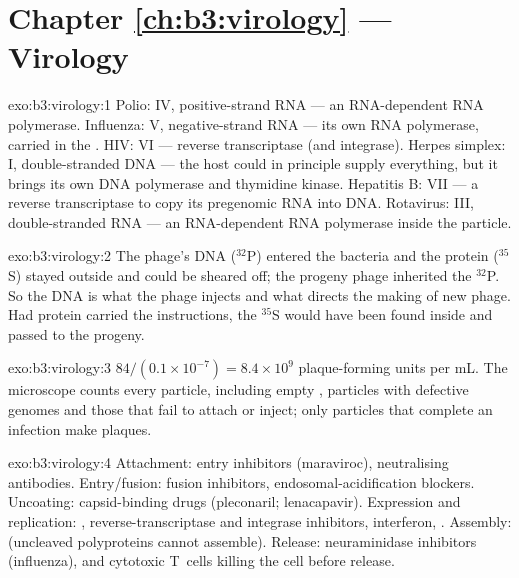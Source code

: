 \section*{Chapter \ref{ch:b3:virology} --- Virology}

\begin{solution}{exo:b3:virology:1}
Polio: IV, positive-strand RNA --- an RNA-dependent RNA polymerase.
Influenza: V, negative-strand RNA --- its own RNA polymerase, carried in
the . HIV: VI --- reverse transcriptase (and integrase). Herpes
simplex: I, double-stranded DNA --- the host could in principle supply
everything, but it brings its own DNA polymerase and thymidine kinase.
Hepatitis B: VII --- a reverse transcriptase to copy its pregenomic RNA
into DNA. Rotavirus: III, double-stranded RNA --- an RNA-dependent RNA
polymerase inside the particle.
\end{solution}

\begin{solution}{exo:b3:virology:2}
The phage's DNA ($^{32}$P) entered the bacteria and the protein
($^{35}$S) stayed outside and could be sheared off; the progeny phage
inherited the $^{32}$P. So the DNA is what the phage injects and what
directs the making of new phage. Had protein carried the instructions,
the $^{35}$S would have been found inside and passed to the progeny.
\end{solution}

\begin{solution}{exo:b3:virology:3}
$84/(0.1\times 10^{-7}) = 8.4\times 10^{9}$ plaque-forming units per mL.
The microscope counts every particle, including empty , particles
with defective genomes and those that fail to attach or inject; only
particles that complete an infection make plaques.
\end{solution}

\begin{solution}{exo:b3:virology:4}
Attachment: entry inhibitors (maraviroc), neutralising antibodies.
Entry/fusion: fusion inhibitors, endosomal-acidification blockers.
Uncoating: capsid-binding drugs (pleconaril; lenacapavir). Expression
and replication: , reverse-transcriptase and
integrase inhibitors, interferon, . Assembly:  (uncleaved polyproteins cannot assemble). Release:
neuraminidase inhibitors (influenza), and cytotoxic T~cells killing the
cell before release.
\end{solution}

